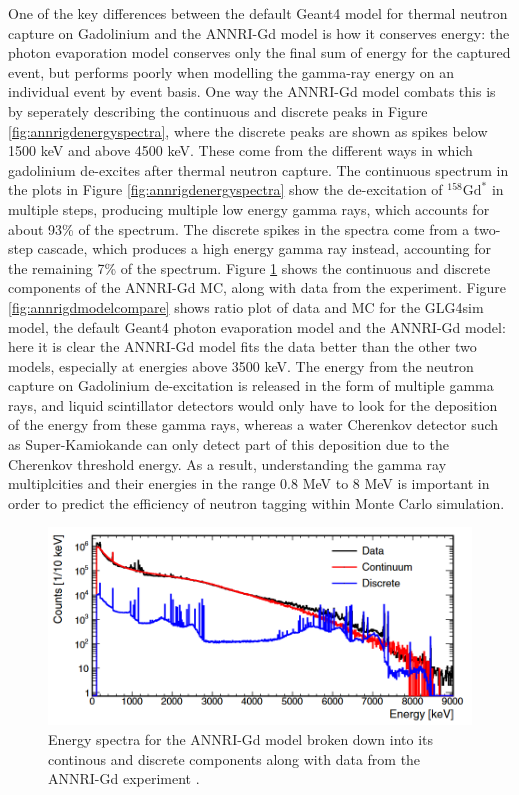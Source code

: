 One of the key differences between the default Geant4 model for thermal neutron capture on Gadolinium and the ANNRI-Gd model is how it conserves energy: the photon evaporation model conserves only the final sum of energy for the captured event, but performs poorly when modelling the gamma-ray energy on an individual event by event basis. One way the ANNRI-Gd model combats this is by seperately describing the continuous and discrete peaks in Figure \ref{fig:annrigdenergyspectra}, where the discrete peaks are shown as spikes below 1500 keV and above 4500 keV. These come from the different ways in which gadolinium de-excites after thermal neutron capture. The continuous spectrum in the plots in Figure \ref{fig:annrigdenergyspectra} show the de-excitation of ${ }^{158} \mathrm{Gd}^{*}$ in multiple steps, producing multiple low energy gamma rays, which accounts for about 93\% of the spectrum. The discrete spikes in the spectra come from a two-step cascade, which produces a high energy gamma ray instead, accounting for the remaining 7\% of the spectrum.
Figure \ref{fig:continousdiscrete} shows the continuous and discrete components of the ANNRI-Gd MC, along with data from the experiment. Figure \ref{fig:annrigdmodelcompare} shows ratio plot of data and MC for the GLG4sim model, the default Geant4 photon evaporation model and the ANNRI-Gd model: here it is clear the ANNRI-Gd model fits the data better than the other two models, especially at energies above 3500 keV. The energy from the neutron capture on Gadolinium de-excitation is released in the form of multiple gamma rays, and liquid scintillator detectors would only have to look for the deposition of the energy from these gamma rays, whereas a water Cherenkov detector such as Super-Kamiokande can only detect part of this deposition due to the Cherenkov threshold energy. As a result, understanding the gamma ray multiplcities and their energies in the range 0.8 MeV to 8 MeV is important in order to predict the efficiency of neutron tagging within Monte Carlo simulation.


\begin{figure}
\includegraphics[width=\textwidth]{Figures/continousdiscrete.png}
\caption{Energy spectra for the ANNRI-Gd model broken down into its continous and discrete components along with data from the ANNRI-Gd experiment \cite{annri_gd_energy}.}
\label{fig:continousdiscrete}
\end{figure}


